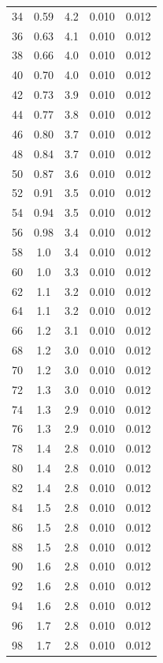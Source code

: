 \documentclass[10pt,twocolumn]{article}
\begin{document}
\begin{table}[!t]
\begin{minipage}[t]{0.48\textwidth}
\begin{tabular}{ccccc}
34 & 0.59 & 4.2 & 0.010 & 0.012 \\
36 & 0.63 & 4.1 & 0.010 & 0.012 \\
38 & 0.66 & 4.0 & 0.010 & 0.012 \\
40 & 0.70 & 4.0 & 0.010 & 0.012 \\
42 & 0.73 & 3.9 & 0.010 & 0.012 \\
44 & 0.77 & 3.8 & 0.010 & 0.012 \\
46 & 0.80 & 3.7 & 0.010 & 0.012 \\
48 & 0.84 & 3.7 & 0.010 & 0.012 \\
50 & 0.87 & 3.6 & 0.010 & 0.012 \\
52 & 0.91 & 3.5 & 0.010 & 0.012 \\
54 & 0.94 & 3.5 & 0.010 & 0.012 \\
56 & 0.98 & 3.4 & 0.010 & 0.012 \\
58 & 1.0 & 3.4 & 0.010 & 0.012 \\
60 & 1.0 & 3.3 & 0.010 & 0.012 \\
62 & 1.1 & 3.2 & 0.010 & 0.012 \\
64 & 1.1 & 3.2 & 0.010 & 0.012 \\
66 & 1.2 & 3.1 & 0.010 & 0.012 \\
68 & 1.2 & 3.0 & 0.010 & 0.012 \\
70 & 1.2 & 3.0 & 0.010 & 0.012 \\
72 & 1.3 & 3.0 & 0.010 & 0.012 \\
74 & 1.3 & 2.9 & 0.010 & 0.012 \\
76 & 1.3 & 2.9 & 0.010 & 0.012 \\
78 & 1.4 & 2.8 & 0.010 & 0.012 \\
80 & 1.4 & 2.8 & 0.010 & 0.012 \\
82 & 1.4 & 2.8 & 0.010 & 0.012 \\
84 & 1.5 & 2.8 & 0.010 & 0.012 \\
86 & 1.5 & 2.8 & 0.010 & 0.012 \\
88 & 1.5 & 2.8 & 0.010 & 0.012 \\
90 & 1.6 & 2.8 & 0.010 & 0.012 \\
92 & 1.6 & 2.8 & 0.010 & 0.012 \\
94 & 1.6 & 2.8 & 0.010 & 0.012 \\
96 & 1.7 & 2.8 & 0.010 & 0.012 \\
98 & 1.7 & 2.8 & 0.010 & 0.012 \\
\bottomrule
\end{tabular}
\end{minipage}\hfill
\begin{minipage}[t]{0.48\textwidth}

\end{minipage}
\end{table}
\end{document}
